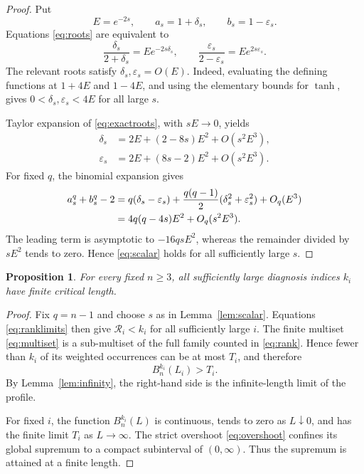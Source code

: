 \documentclass[11pt]{article}
\newtheorem{proposition}[theorem]{Proposition}
\theoremstyle{remark}
\begin{document}
\begin{proof}
Put
\[
 E=e^{-2s},
 \qquad
 a_s=1+\delta_s,
 \qquad
 b_s=1-\varepsilon_s.
\]
Equations \eqref{eq:roots} are equivalent to
\begin{equation}\label{eq:exactroots}
 \frac{\delta_s}{2+\delta_s}=Ee^{-2s\delta_s},
 \qquad
 \frac{\varepsilon_s}{2-\varepsilon_s}=Ee^{2s\varepsilon_s}.
\end{equation}
The relevant roots satisfy $\delta_s,\varepsilon_s=O(E)$.  Indeed,
evaluating the defining functions at $1+4E$ and $1-4E$, and using the
elementary bounds for $\tanh$, gives
$0<\delta_s,\varepsilon_s<4E$ for all large $s$.

Taylor expansion of \eqref{eq:exactroots}, with $sE\to0$, yields
\begin{align}
 \delta_s&=2E+(2-8s)E^2+O(s^2E^3),\label{eq:deltaexp}\\
 \varepsilon_s&=2E+(8s-2)E^2+O(s^2E^3).\label{eq:epsilonexp}
\end{align}
For fixed $q$, the binomial expansion gives
\begin{align}
 a_s^q+b_s^q-2
 &=q(\delta_s-\varepsilon_s)
 +\frac{q(q-1)}2(\delta_s^2+\varepsilon_s^2)+O_q(E^3)\notag\\
 &=4q(q-4s)E^2+O_q(s^2E^3).\label{eq:sign}
\end{align}
The leading term is asymptotic to $-16qsE^2$, whereas the remainder divided
by $sE^2$ tends to zero.  Hence \eqref{eq:scalar} holds for all sufficiently
large $s$.
\end{proof}

\begin{proposition}\label{prop:diagnosis}
For every fixed $n\ge3$, all sufficiently large diagnosis indices $k_i$
have finite critical length.
\end{proposition}

\begin{proof}
Fix $q=n-1$ and choose $s$ as in Lemma~\ref{lem:scalar}.  Equations
\eqref{eq:ranklimits} then give $\mathcal R_i<k_i$ for all sufficiently
large $i$.  The finite multiset \eqref{eq:multiset} is a sub-multiset of the
full family counted in \eqref{eq:rank}.  Hence fewer than $k_i$ of its
weighted occurrences can be at most $T_i$, and therefore
\begin{equation}\label{eq:overshoot}
 B_n^{k_i}(L_i)>T_i.
\end{equation}
By Lemma~\ref{lem:infinity}, the right-hand side is the infinite-length
limit of the profile.

For fixed $i$, the function $B_n^{k_i}(L)$ is continuous, tends to zero as
$L\downarrow0$, and has the finite limit $T_i$ as $L\to\infty$.
The strict overshoot \eqref{eq:overshoot} confines its global supremum to a
compact subinterval of $(0,\infty)$.  Thus the supremum is attained at a
finite length.
\end{proof}
\end{document}
